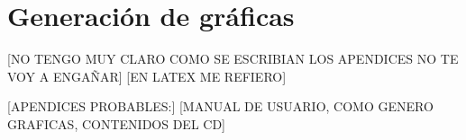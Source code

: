 \chapter{Generación de gráficas}
[NO TENGO MUY CLARO COMO SE ESCRIBIAN LOS APENDICES NO TE VOY A ENGAÑAR]
[EN LATEX ME REFIERO]

[APENDICES PROBABLES:]
[MANUAL DE USUARIO, COMO GENERO GRAFICAS, CONTENIDOS DEL CD]









 